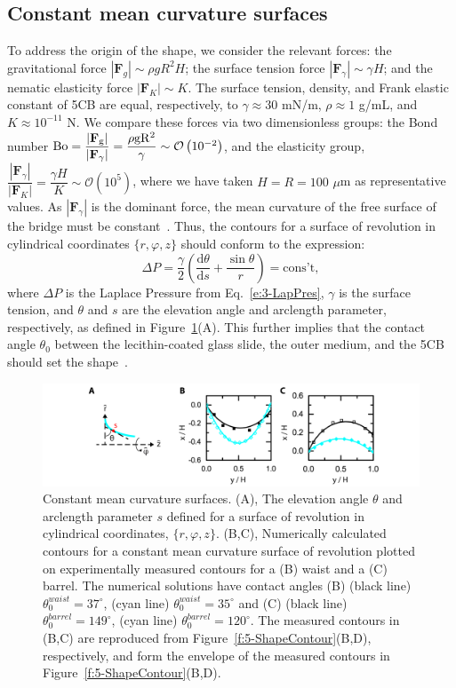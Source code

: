 \subsection{Constant mean curvature surfaces}
To address the origin of the shape, we consider the relevant forces: the gravitational force $|\mathbf{F}_g| \sim \rho g R^2 H$; the surface tension force $|\mathbf{F}_{\gamma}| \sim \gamma H$; and the nematic elasticity force $|\mathbf{F}_K| \sim K$.
The surface tension, density, and Frank elastic constant of 5CB are equal, respectively, to $\gamma \approx 30$ mN/m, $\rho \approx 1$ g/mL, and $K \approx 10^{-11}$ N.
We compare these forces via two dimensionless groups: the Bond number $\rm{Bo} = \dfrac{|\mathbf{F}_g|}{|\mathbf{F}_{\gamma}|} = \dfrac{\rho g R^2}{\gamma} \sim  \mathcal{O}\left (10^{-2} \right)$, and the elasticity group,
 $\dfrac{|\mathbf{F}_{\gamma}|}{|\mathbf{F}_K|} =  \dfrac{\gamma H}{K} \sim \mathcal{O}\left (10^{5} \right )$, where we have taken $H = R = 100$ $\mu$m as representative values.
As $|\mathbf{F}_{\gamma}|$ is the dominant force, the mean curvature of the free surface of the bridge must be constant~\cite{RN178}.
Thus, the contours for a surface of revolution in cylindrical coordinates $\{r,\varphi, z\}$ should conform to the expression:
\begin{equation}
  \Delta P = \frac{\gamma}{2} \left ( \frac{\textrm{d}\theta}{\textrm{d}s} + \frac{\sin \theta}{r} \right ) = \textrm{cons't},\label{e:5-ConsMeanCurv}
\end{equation}
where $\Delta P$ is the Laplace Pressure from Eq.~\ref{e:3-LapPres}, $\gamma$ is the surface tension, and $\theta$ and $s$ are the elevation angle and arclength parameter, respectively, as defined in Figure~\ref{f:5-ShapeEnvelope}(A).
This further implies that the contact angle $\theta_0$ between the lecithin-coated glass slide, the outer medium, and the 5CB should set the shape~\cite{RN178}.
\begin{figure}
  \centering
  \includegraphics{figures/C5/Ch5-Figs_ShapeEnvelope.png}
  \caption{Constant mean curvature surfaces.
  (A), The elevation angle $\theta$ and arclength parameter $s$ defined for a surface of revolution in cylindrical coordinates, $\{r,\varphi, z\}$.
  (B,C), Numerically calculated contours for a constant mean curvature surface of revolution plotted on experimentally measured contours for a (B) waist and a (C) barrel.
  The numerical solutions have contact angles (B) (black line) $\theta_0^{waist} = 37^{\circ}$, (cyan line) $\theta_0^{waist} = 35^{\circ}$ and (C) (black line) $\theta_0^{barrel} = 149^{\circ}$, (cyan line) $\theta_0^{barrel} = 120^{\circ}$.
  The measured contours in (B,C) are reproduced from Figure~\ref{f:5-ShapeContour}(B,D), respectively, and form the envelope of the measured contours in Figure~\ref{f:5-ShapeContour}(B,D).}\label{f:5-ShapeEnvelope}
\end{figure}

